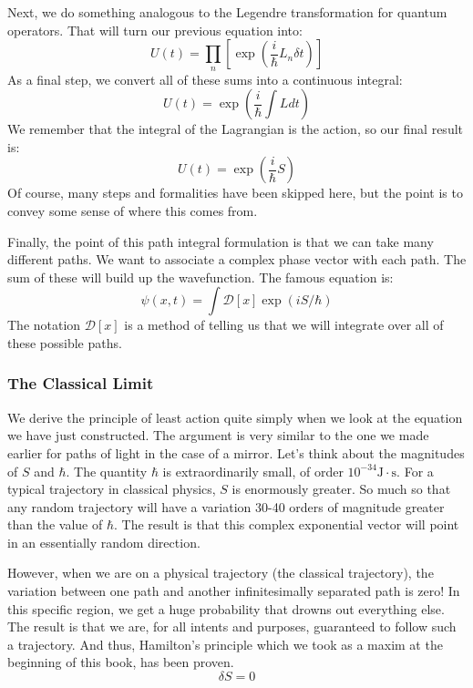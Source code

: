 Next, we do something analogous to the Legendre transformation for quantum operators. That will turn our previous equation into:
$$U(t)=\prod_{n}\left[\exp\left(\frac{i}{\hbar}L_n\delta t\right)\right]$$
As a final step, we convert all of these sums into a continuous integral:
$$U(t)=\exp\left(\frac{i}{\hbar}\int Ld t\right)$$
We remember that the integral of the \gls{Lagrangian} is the action, so our final result is:
$$U(t)=\exp\left(\frac{i}{\hbar}S \right)$$
Of course, many steps and formalities have been skipped here, but the point is to convey some sense of where this comes from.

Finally, the point of this path integral formulation is that we can take many different paths. We want to associate a complex phase vector with each path. The sum of these will build up the wavefunction. The famous equation is:
$$\psi(x,t)=\int\mathcal{D}[x]\exp(iS/\hbar)$$
The notation $\mathcal{D}[x]$ is a method of telling us that we will integrate over all of these possible paths.

\subsubsection{The Classical Limit}
We derive the principle of least action quite simply when we look at the equation we have just constructed. The argument is very similar to the one we made earlier for paths of light in the case of a mirror. Let's think about the magnitudes of $S$ and $\hbar$. The quantity $\hbar$ is extraordinarily small, of order $10^{-34} \mathrm{ J\cdot s}$. For a typical trajectory in classical physics, $S$ is enormously greater. So much so that any random trajectory will have a variation 30-40 orders of magnitude greater than the value of $\hbar$. The result is that this complex exponential vector will point in an essentially random direction. 

However, when we are on a physical trajectory (the classical trajectory), the variation between one path and another infinitesimally separated path is zero! In this specific region, we get a huge probability that drowns out everything else. The result is that we are, for all intents and purposes, guaranteed to follow such a trajectory. And thus, Hamilton's principle which we took as a maxim at the beginning of this book, has been proven.
$$\delta S=0$$

\newpage
\printendnotes



